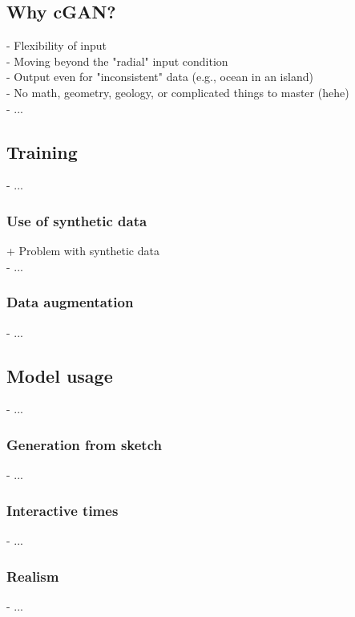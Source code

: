 \subsection{Why cGAN?}
- Flexibility of input \\
- Moving beyond the "radial" input condition \\
- Output even for "inconsistent" data (e.g., ocean in an island) \\
- No math, geometry, geology, or complicated things to master (hehe) \\
- ... 

\subsection{Training}
- ...

\subsubsection{Use of synthetic data}
+ Problem with synthetic data \\
- ...

\subsubsection{Data augmentation}
- ...

\subsection{Model usage}
- ...

\subsubsection{Generation from sketch}
- ...

\subsubsection{Interactive times}
- ...

\subsubsection{Realism}
- ...
